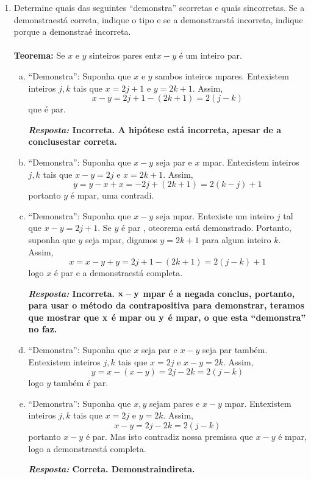 \begin{enumerate}[{\bf 1.}]
\item Determine quais das seguintes ``demonstra\cois'' s\ao corretas e quais s\ao incorretas. Se a demonstra\cao est\'a correta, indique o tipo e se a demonstra\cao est\'a incorreta, indique porque a demonstra\cao \'e incorreta.
\\
\\
{\bf Teorema:} Se $x$ e $y$ s\ao inteiros pares ent\ao $x-y$ \'e um inteiro par.

\begin{enumerate}[a)]
\item ``Demonstra'': Suponha que $x$ e $y$ s\ao ambos inteiros \ih mpares. Ent\ao existem inteiros $j,k$ tais que $x=2j+1$ e $y=2k+1$. Assim,
\[
x-y=2j+1-(2k+1)=2(j-k)
\] 
que \'e par.

{\bf{\it Resposta:} Incorreta. A hip\'otese est\'a incorreta, apesar de a conclus\ao estar correta.}

\item ``Demonstra'': Suponha que $x-y$ seja par e $x$ \ih mpar. Ent\ao existem inteiros $j,k$ tais que $x-y=2j$ e $x=2k+1$. Assim,
\[
y=y-x+x=-2j+(2k+1)=2(k-j)+1
\] 
portanto $y$ \'e \ih mpar, uma contradi\caoi.
\item ``Demonstra'': Suponha que $x-y$ seja \ih mpar. Ent\ao existe um inteiro $j$ tal que $x-y=2j+1$. Se $y$ \'e par , oteorema est\'a demonstrado. Portanto, suponha que $y$ seja \ih mpar, digamos $y=2k+1$ para algum inteiro $k$. Assim,
\[
x=x-y+y=2j+1-(2k+1)=2(j-k)+1
\]
logo $x$ \'e par e a demonstra\cao est\'a completa.  

{\bf{\it Resposta:} Incorreta. ${\bf x-y}$ \ih mpar \'e a nega\cao da conclus\ao, portanto, para usar o m\'etodo da contrapositiva para demonstrar, ter\ih amos que mostrar que ${\bf x}$ \'e \ih mpar ou ${\bf y}$ \'e \ih mpar, o que esta ``demonstra\caoi'' n\ao o faz.}

\item ``Demonstra'': Suponha que $x$ seja par e $x-y$ seja par tamb\'em. Ent\ao existem inteiros $j,k$ tais que $x=2j$ e $x-y=2k$. Assim,
\[
y=x-(x-y)=2j-2k=2(j-k)
\]
logo $y$ tamb\'em \'e par.

\item ``Demonstra'': Suponha que $x,y$ sejam pares e $x-y$ \ih mpar. Ent\ao existem inteiros $j,k$ tais que $x=2j$ e $y=2k$. Assim,
\[
x-y=2j-2k=2(j-k)
\] 
portanto $x-y$ \'e par. Mas isto contradiz nossa premissa que $x-y$ \'e \ih mpar, logo a demonstra\cao est\'a completa.

{\bf{\it Resposta:} Correta. Demonstra\cao indireta.}


\end{enumerate}
\end{enumerate}
